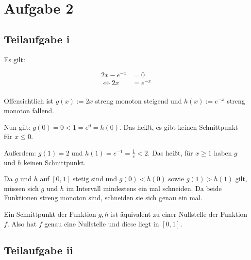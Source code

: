 \section*{Aufgabe 2}
\subsection*{Teilaufgabe i}
Es gilt:

\begin{align}
    2x - e^{-x} &= 0\\
    \Leftrightarrow 2x &= e^{-x}\\
\end{align}

Offensichtlich ist $g(x) := 2x$ streng monoton steigend und $h(x) := e^{-x}$ streng
monoton fallend.

Nun gilt: $g(0) = 0 < 1 = e^0 = h(0)$. Das heißt, es gibt keinen
Schnittpunkt für $x \leq 0$.

Außerdem: $g(1) = 2$ und $h(1) = e^{-1} = \frac{1}{e} < 2$.
Das heißt, für $x \geq 1$ haben $g$ und $h$ keinen Schnittpunkt.

Da $g$ und $h$ auf $[0,1]$ stetig sind und $g(0) < h(0)$ sowie $g(1) > h(1)$
gilt, müssen sich $g$ und $h$ im Intervall mindestens ein mal schneiden.
Da beide Funktionen streng monoton sind, schneiden sie sich genau
ein mal.

Ein Schnittpunkt der Funktion $g,h$ ist äquivalent zu einer
Nullstelle der Funktion $f$. Also hat $f$ genau eine Nullstelle
und diese liegt in $[0,1]$.

\subsection*{Teilaufgabe ii}
